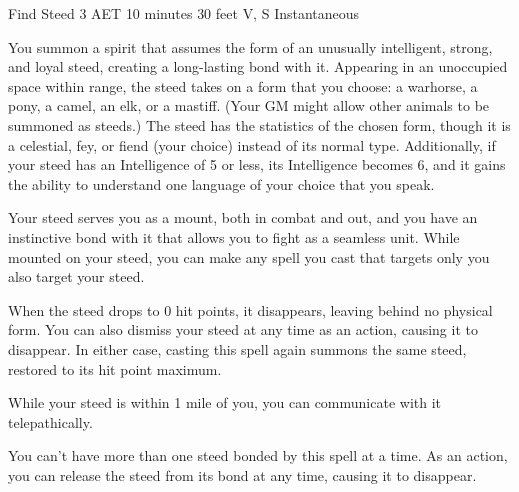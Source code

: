 \begin{DndSidebar}{Find Steed}
    \label{spell:find-steed}
{3 AET}
{10 minutes}
{30 feet}
{V, S}
{Instantaneous}

You summon a spirit that assumes the form of an unusually intelligent, strong, and loyal steed, creating a long-lasting bond with it. Appearing in an unoccupied space within range, the steed takes on a form that you choose: a warhorse, a pony, a camel, an elk, or a mastiff. (Your GM might allow other animals to be summoned as steeds.) The steed has the statistics of the chosen form, though it is a celestial, fey, or fiend (your choice) instead of its normal type. Additionally, if your steed has an Intelligence of 5 or less, its Intelligence becomes 6, and it gains the ability to understand one language of your choice that you speak.

Your steed serves you as a mount, both in combat and out, and you have an instinctive bond with it that allows you to fight as a seamless unit. While mounted on your steed, you can make any spell you cast that targets only you also target your steed.

When the steed drops to 0 hit points, it disappears, leaving behind no physical form. You can also dismiss your steed at any time as an action, causing it to disappear. In either case, casting this spell again summons the same steed, restored to its hit point maximum.

While your steed is within 1 mile of you, you can communicate with it telepathically.

You can't have more than one steed bonded by this spell at a time. As an action, you can release the steed from its bond at any time, causing it to disappear.
\end{DndSidebar}